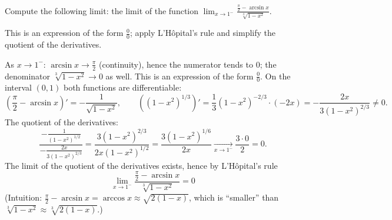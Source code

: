 
\begin{question}
Compute the following limit:
the limit of the function $\displaystyle\lim_{x\to1^-}\frac{\frac\pi2-\arcsin x}{\sqrt[3]{1-x^2}}$.
\end{question}

\begin{hint}
This is an expression of the form $\frac00$; apply L'Hôpital's rule and simplify the quotient of the derivatives.
\end{hint}

\begin{solution}
As $x\to1^-$: $\arcsin x\to\frac\pi2$ (continuity), hence the numerator tends to $0$; the denominator $\sqrt[3]{1-x^2}\to0$ as well. This is an expression of the form $\frac00$. On the interval $(0,1)$ both functions are differentiable:
\[ \left(\frac\pi2-\arcsin x\right)'=-\frac{1}{\sqrt{1-x^2}},\qquad \left((1-x^2)^{1/3}\right)'=\frac13(1-x^2)^{-2/3}\cdot(-2x)=-\frac{2x}{3(1-x^2)^{2/3}}\neq0. \]
The quotient of the derivatives:
\[ \frac{-\frac{1}{(1-x^2)^{1/2}}}{-\frac{2x}{3(1-x^2)^{2/3}}}=\frac{3(1-x^2)^{2/3}}{2x(1-x^2)^{1/2}}=\frac{3(1-x^2)^{1/6}}{2x}\xrightarrow[x\to1^-]{}\frac{3\cdot0}{2}=0. \]
The limit of the quotient of the derivatives exists, hence by L'Hôpital's rule
\[ \boxed{\lim_{x\to1^-}\frac{\frac\pi2-\arcsin x}{\sqrt[3]{1-x^2}}=0} \]
(Intuition: $\frac\pi2-\arcsin x=\arccos x\approx\sqrt{2(1-x)}$, which is ``smaller'' than $\sqrt[3]{1-x^2}\approx\sqrt[3]{2(1-x)}$.)
\end{solution}

